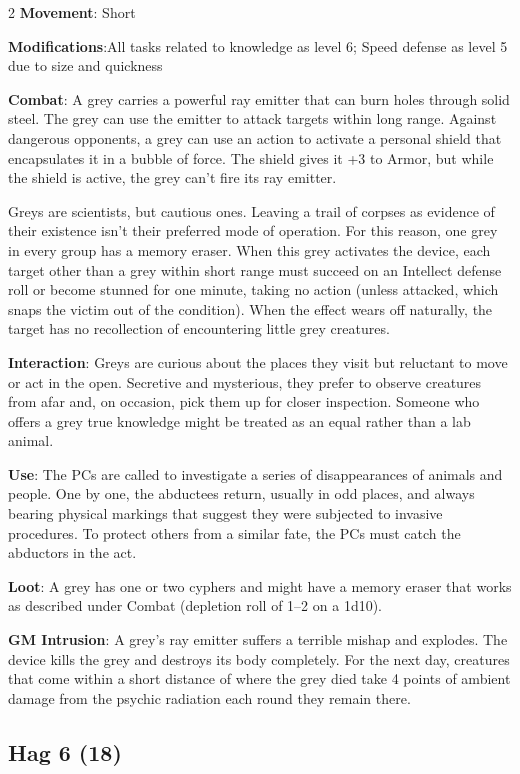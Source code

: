 \begin{multicols}{2}
\textbf{Movement}: Short

\textbf{Modifications}:All tasks related to knowledge as level 6; Speed defense as level 5 due to size and quickness

\textbf{Combat}: A grey carries a powerful ray emitter that can burn holes through solid steel. The grey can use the emitter to attack targets within long range. Against dangerous opponents, a grey can use an action to activate a personal shield that encapsulates it in a bubble of force. The shield gives it +3 to Armor, but while the shield is active, the grey can’t fire its ray emitter.

Greys are scientists, but cautious ones. Leaving a trail of corpses as evidence of their existence isn’t their preferred mode of operation. For this reason, one grey in every group has a memory eraser. When this grey activates the device, each target other than a grey within short range must succeed on an Intellect defense roll or become stunned for one minute, taking no action (unless attacked, which snaps the victim out of the condition). When the effect wears off naturally, the target has no recollection of encountering little grey creatures.

\textbf{Interaction}: Greys are curious about the places they visit but reluctant to move or act in the open. Secretive and mysterious, they prefer to observe creatures from afar and, on occasion, pick them up for closer inspection. Someone who offers a grey true knowledge might be treated as an equal rather than a lab animal.

\textbf{Use}: The PCs are called to investigate a series of disappearances of animals and people. One by one, the abductees return, usually in odd places, and always bearing physical markings that suggest they were subjected to invasive procedures. To protect others from a similar fate, the PCs must catch the abductors in the act.

\textbf{Loot}: A grey has one or two cyphers and might have a memory
eraser that works as described under Combat (depletion roll
of 1–2 on a 1d10).

\textbf{GM Intrusion}: A grey’s ray emitter suffers a terrible mishap and explodes. The device kills the grey and destroys its body completely. For the next day, creatures that come within a short distance of where the grey died take 4 points of ambient damage from the psychic radiation each round they remain there.

\subsection{Hag 6 (18)}


\end{multicols}
